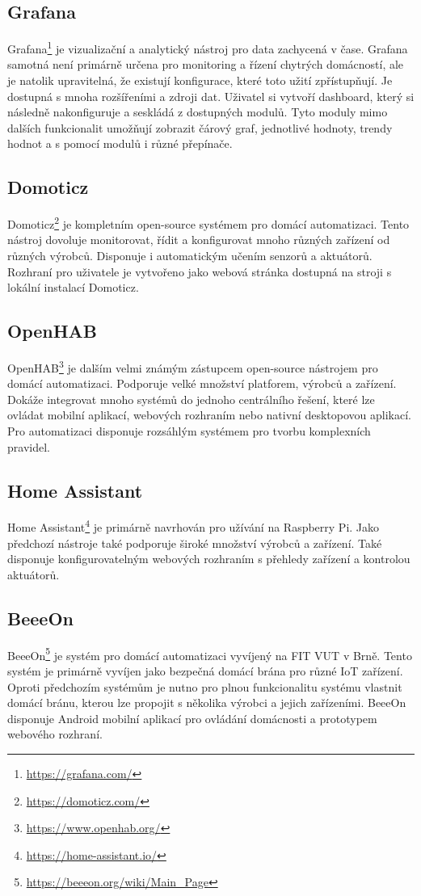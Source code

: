 \documentclass[11pt,a4paper]{article}
\begin{document}
\subsection{Grafana}
Grafana\footnote{\url{https://grafana.com/}} je vizualizační a analytický nástroj pro data zachycená v čase. Grafana samotná není primárně určena pro monitoring a řízení chytrých domácností, ale je natolik upravitelná, že existují konfigurace, které toto užití zpřístupňují. Je dostupná s mnoha rozšířeními a zdroji dat. Uživatel si vytvoří dashboard, který si následně nakonfiguruje a seskládá z dostupných modulů. Tyto moduly mimo dalších funkcionalit umožňují zobrazit čárový graf, jednotlivé hodnoty, trendy hodnot a s pomocí modulů i různé přepínače.

\subsection{Domoticz}
Domoticz\footnote{\url{https://domoticz.com/}} je kompletním open-source systémem pro domácí automatizaci. Tento nástroj dovoluje monitorovat, řídit a konfigurovat mnoho různých zařízení od různých výrobců. Disponuje i automatickým učením senzorů a aktuátorů. Rozhraní pro uživatele je vytvořeno jako webová stránka dostupná na stroji s lokální instalací Domoticz.

\subsection{OpenHAB}
OpenHAB\footnote{\url{https://www.openhab.org/}} je dalším velmi známým zástupcem open-source nástrojem pro domácí automatizaci. Podporuje velké množství platforem, výrobců a zařízení. Dokáže integrovat mnoho systémů do jednoho centrálního řešení, které lze ovládat mobilní aplikací, webových rozhraním nebo nativní desktopovou aplikací. Pro automatizaci disponuje rozsáhlým systémem pro tvorbu komplexních pravidel.

\subsection{Home Assistant}
Home Assistant\footnote{\url{https://home-assistant.io/}} je primárně navrhován pro užívání na Raspberry Pi. Jako předchozí nástroje také podporuje široké množství výrobců a zařízení. Také disponuje konfigurovatelným webových rozhraním s přehledy zařízení a kontrolou aktuátorů.

\subsection{BeeeOn}
BeeeOn\footnote{\url{https://beeeon.org/wiki/Main\_Page}} je systém pro domácí automatizaci vyvíjený na FIT VUT v Brně. Tento systém je primárně vyvíjen jako bezpečná domácí brána pro různé IoT zařízení. Oproti předchozím systémům je nutno pro plnou funkcionalitu systému vlastnit domácí bránu, kterou lze propojit s několika výrobci a jejich zařízeními. BeeeOn disponuje Android mobilní aplikací pro ovládání domácnosti a prototypem webového rozhraní.
\end{document}

